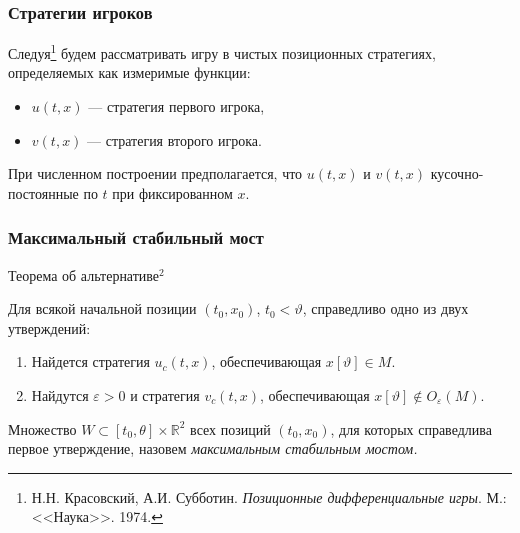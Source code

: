 \documentclass{beamer}
\newcommand{\dimension}{\mathbb{R}^2}
\begin{document}

\begin{frame}
   \frametitle{Стратегии игроков}

Следуя\footnote{Н.Н. Красовский, А.И. Субботин. \emph{Позиционные дифференциальные игры}. М.: <<Наука>>. 1974.} будем рассматривать игру в чистых позиционных стратегиях, определяемых как измеримые функции:

\begin{itemize}
\item $u(t, x)$ --- стратегия первого игрока,
\item $v(t, x)$ --- стратегия второго игрока.
\end{itemize}

\vspace{0.5em}

При численном построении предполагается, что $u(t, x)$ и $v(t, x)$ кусочно-постоянные по $t$ при фиксированном $x$.

\end{frame}
  


  \begin{frame}
    \frametitle{Максимальный стабильный мост}


\begin{block}{Теорема об альтернативе$^2$}

Для всякой начальной позиции $(t_0, x_0)$, $t_0 < \vartheta$, справедливо одно из двух утверждений:

\begin{enumerate}
\item Найдется стратегия $u_c(t,x)$, обеспечивающая $x[\vartheta] \in M$.
\item Найдутся $\varepsilon > 0$ и стратегия $v_c(t,x)$, обеспечивающая $x[\vartheta] \notin O_\varepsilon(M)$.
\end{enumerate}
\end{block}

\vspace{1em}

Множество $W \subset [t_0, \theta] \times \dimension$ всех позиций $(t_0, x_0)$, для которых справедлива первое утверждение, назовем \emph{максимальным стабильным мостом.}

  \end{frame}
  
  
\end{document}
